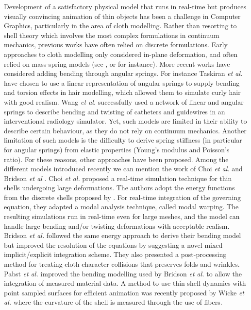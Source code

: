 \documentclass{llncs}
\begin{document}
Development of a satisfactory physical model that runs in real-time but produces visually convincing animation of thin objects has been a challenge in Computer Graphics, particularly in the area of cloth modelling. Rather than resorting to shell theory which involves the most complex formulations in continuum mechanics, previous works have often relied on discrete formulations. Early approaches to cloth modelling only considered in-plane deformation, and often relied on mass-spring models (see \cite{Provot95}, \cite{Hammer08} or \cite{Yu08} for instance). 
More recent works have considered adding bending through angular springs. For instance Taskiran \emph{et al.} \cite{Taskiran05} have chosen to use a linear representation of angular springs to supply bending and torsion effects in hair modelling, which allowed them to simulate curly hair with good realism. Wang \emph{et al.} \cite{Wang07} successfully used a network of linear and angular springs to describe bending and twisting of catheters and guidewires in an interventional radiology simulator. 
Yet, such models are limited in their ability to describe certain behaviour, as they do not rely on continuum mechanics. Another limitation of such models is the difficulty to derive spring stiffness (in particular for angular springs) from elastic properties (Young's modulus and Poisson's ratio). For these reasons, other approaches have been proposed. Among the different models introduced recently we can mention the work of Choi \emph{et al.} \cite{Choi07} and Bridson \emph{et al} \cite{Bridson03}. Choi \emph{et al.} proposed a real-time simulation technique for thin shells undergoing large deformations. The authors adopt the energy functions from the discrete shells proposed by \cite{Grinspun03}. For real-time integration of the governing equation, they adapted a modal analysis technique, called modal warping. The resulting simulations run in real-time even for large meshes, and the model can handle large bending and/or twisting deformations with acceptable realism. Bridson \emph{et al.} followed the same energy approach to derive their bending model but improved the resolution of the equations by suggesting a novel mixed implicit/explicit integration scheme. They also presented a post-processing method for treating cloth-character collisions that preserves folds and wrinkles. Pabst \emph{et al.} improved the bending modelling used by Bridson \emph{et al.} to allow the integration of measured material data. A method to use thin shell dynamics with point sampled surfaces for efficient animation was recently proposed by Wicke \emph{et al.} \cite{Wicke05} where the curvature of the shell is measured through the use of fibers.
\end{document}
